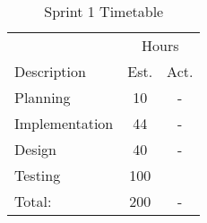 \begin{table}[ht] \small \center
\caption{Sprint 1 Timetable}
\begin{tabularx}{\textwidth}{X c c}
	\toprule
	 & \multicolumn{2}{c}{Hours} \\
	\cmidrule(r){2-3}
	 Description & Est. & Act. \\
	\midrule
	Planning & 10 & -\\
	\addlinespace
	Implementation & 44 & -\\
	\addlinespace
	Design & 40 & -\\
	\addlinespace
	Testing & 100 & \\
	\midrule
	Total: & 200 & - \\
\end{tabularx}
\end{table} 
